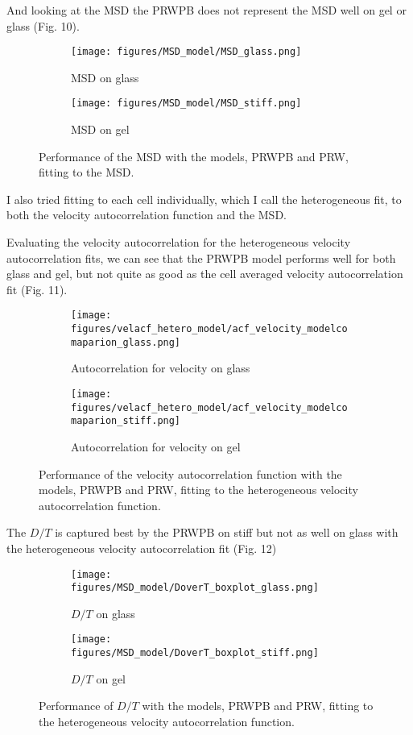 \documentclass[12pt]{article}
\begin{document}
And looking at the MSD the PRWPB does not represent the MSD well on gel or glass (Fig. 10).

\begin{figure}[h!]
  \centering
  \begin{subfigure}[b]{0.4\linewidth}
    \texttt{[image: figures/MSD\_model/MSD\_glass.png]}
    \caption{MSD on glass}
  \end{subfigure}
  \begin{subfigure}[b]{0.4\linewidth}
    \texttt{[image: figures/MSD\_model/MSD\_stiff.png]}
    \caption{MSD on gel}
  \end{subfigure}
  \caption{Performance of the MSD with the models, PRWPB and PRW, fitting to the MSD.}
\end{figure}

I also tried fitting to each cell individually, which I call the heterogeneous fit, to both the velocity autocorrelation function and the MSD.

Evaluating the velocity autocorrelation for the heterogeneous velocity autocorrelation fits, we can see that the PRWPB model performs well for both glass and gel, but 
not quite as good as the cell averaged velocity autocorrelation fit (Fig. 11). 

\begin{figure}[h!]
  \centering
  \begin{subfigure}[b]{0.4\linewidth}
    \texttt{[image: figures/velacf\_hetero\_model/acf\_velocity\_modelcomaparion\_glass.png]}
    \caption{Autocorrelation for velocity on glass}
  \end{subfigure}
  \begin{subfigure}[b]{0.4\linewidth}
    \texttt{[image: figures/velacf\_hetero\_model/acf\_velocity\_modelcomaparion\_stiff.png]}
    \caption{Autocorrelation for velocity on gel}
  \end{subfigure}
  \caption{Performance of the velocity autocorrelation function with the models, PRWPB and PRW, fitting to the heterogeneous velocity autocorrelation function.}
\end{figure}

The $D/T$ is captured best by the PRWPB on stiff but not as well on glass with the heterogeneous velocity autocorrelation fit (Fig. 12)

\begin{figure}[h!]
  \centering
  \begin{subfigure}[b]{0.4\linewidth}
    \texttt{[image: figures/MSD\_model/DoverT\_boxplot\_glass.png]}
    \caption{$D/T$ on glass}
  \end{subfigure}
  \begin{subfigure}[b]{0.4\linewidth}
    \texttt{[image: figures/MSD\_model/DoverT\_boxplot\_stiff.png]}
    \caption{$D/T$ on gel}
  \end{subfigure}
  \caption{Performance of $D/T$ with the models, PRWPB and PRW, fitting to the heterogeneous velocity autocorrelation function.}
\end{figure}
\end{document}
